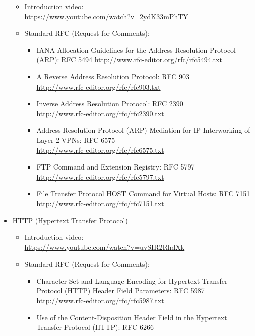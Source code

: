 \begin{itemize}
\begin{itemize}
\item Introduction video:\\
\url{https://www.youtube.com/watch?v=2ydK33mPhTY}\\
\item Standard RFC (Request for Comments): 
\begin{itemize}
\item IANA Allocation Guidelines for the Address Resolution 
Protocol (ARP): RFC 5494
\url{http://www.rfc-editor.org/rfc/rfc5494.txt}
\item A Reverse Address Resolution Protocol: RFC 903\\
\url{http://www.rfc-editor.org/rfc/rfc903.txt}
\item Inverse Address Resolution Protocol: RFC 2390\\
\url{http://www.rfc-editor.org/rfc/rfc2390.txt}
\item Address Resolution Protocol (ARP) Mediation for IP 
Interworking of Layer 2 VPNs: RFC 6575\\
\url{http://www.rfc-editor.org/rfc/rfc6575.txt}
\item FTP Command and Extension Registry: RFC 5797\\
\url{http://www.rfc-editor.org/rfc/rfc5797.txt}
\item File Transfer Protocol HOST Command for Virtual Hosts: RFC 7151\\
\url{http://www.rfc-editor.org/rfc/rfc7151.txt}
\end{itemize}
\end{itemize}
\item HTTP (Hypertext Transfer Protocol)\\
\begin{itemize}
\item Introduction video:\\
\url{https://www.youtube.com/watch?v=uvSIR2RhdXk}
\item Standard RFC (Request for Comments): \\
\begin{itemize}
\item Character Set and Language Encoding for Hypertext Transfer Protocol 
(HTTP) Header Field Parameters: RFC 5987 \\
\url{http://www.rfc-editor.org/rfc/rfc5987.txt}
\item Use of the Content-Disposition Header Field in the Hypertext Transfer 
Protocol (HTTP): RFC 6266\\

\end{itemize}
\end{itemize}
\end{itemize}
